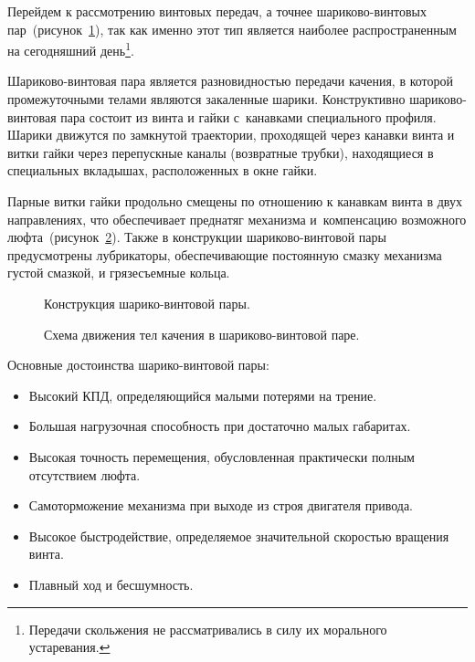 Перейдем к рассмотрению винтовых передач, а точнее шариково-винтовых пар~(рисунок~\cref{fig:ballscrew}), так как именно этот тип является наиболее распространенным на сегодняшний день\footnote{Передачи скольжения не рассматривались в силу их морального устаревания.}.

Шариково-винтовая пара является разновидностью передачи качения, в которой промежуточными телами являются закаленные шарики. Конструктивно шариково-винтовая пара состоит из винта и гайки с~канавками специального профиля. Шарики движутся по замкнутой траектории, проходящей через канавки винта и витки гайки через перепускные каналы (возвратные трубки), находящиеся в специальных вкладышах, расположенных в окне гайки.

Парные витки гайки продольно смещены по отношению к канавкам винта в двух направлениях, что обеспечивает преднатяг механизма и~компенсацию возможного люфта~(рисунок~\cref{fig:ballscrew-1}). Также в конструкции шариково-винтовой пары предусмотрены лубрикаторы, обеспечивающие постоянную смазку механизма густой смазкой, и грязесъемные кольца.

\begin{figure}[ht]
	\caption{Конструкция шарико-винтовой пары.}\label{fig:ballscrew}
\end{figure}

\begin{figure}[ht]
	\caption{Схема движения тел качения в шариково-винтовой паре.}\label{fig:ballscrew-1}
\end{figure}

Основные достоинства шарико-винтовой пары:

\begin{itemize}
	\item Высокий КПД, определяющийся малыми потерями на трение.
	
	\item Большая нагрузочная способность при достаточно малых габаритах.
	
	\item Высокая точность перемещения, обусловленная практически полным отсутствием люфта.
	
	\item Самоторможение механизма при выходе из строя двигателя привода.
	
	\item Высокое быстродействие, определяемое значительной скоростью вращения винта.
	
	\item Плавный ход и бесшумность.
\end{itemize}

